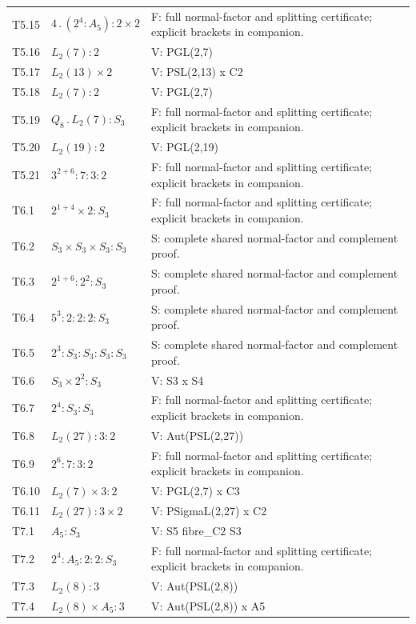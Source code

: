\begin{longtable}{@{}lp{.40\linewidth}>{\raggedright\arraybackslash}p{.46\linewidth}@{}}
T5.15 & $4 \mathbin{.} (2^4 : A_{5}) : 2 \times 2$ & F: full normal-factor and splitting certificate; explicit brackets in companion.\\
T5.16 & $L_{2}(7) : 2$ & V: PGL(2,7)\\
T5.17 & $L_{2}(13) \times 2$ & V: PSL(2,13) x C2\\
T5.18 & $L_{2}(7) : 2$ & V: PGL(2,7)\\
T5.19 & $Q_{8} \mathbin{.} L_{2}(7) : S_{3}$ & F: full normal-factor and splitting certificate; explicit brackets in companion.\\
T5.20 & $L_{2}(19) : 2$ & V: PGL(2,19)\\
T5.21 & $3^{2+6} : 7 : 3 : 2$ & F: full normal-factor and splitting certificate; explicit brackets in companion.\\
T6.1 & $2^{1+4} \times 2 : S_{3}$ & F: full normal-factor and splitting certificate; explicit brackets in companion.\\
T6.2 & $S_{3} \times S_{3} \times S_{3} : S_{3}$ & S: complete shared normal-factor and complement proof.\\
T6.3 & $2^{1+6} : 2^2 : S_{3}$ & S: complete shared normal-factor and complement proof.\\
T6.4 & $5^3 : 2 : 2 : 2 : S_{3}$ & S: complete shared normal-factor and complement proof.\\
T6.5 & $2^3 : S_{3} : S_{3} : S_{3} : S_{3}$ & S: complete shared normal-factor and complement proof.\\
T6.6 & $S_{3} \times 2^2 : S_{3}$ & V: S3 x S4\\
T6.7 & $2^4 : S_{3} : S_{3}$ & F: full normal-factor and splitting certificate; explicit brackets in companion.\\
T6.8 & $L_{2}(27) : 3 : 2$ & V: Aut(PSL(2,27))\\
T6.9 & $2^6 : 7 : 3 : 2$ & F: full normal-factor and splitting certificate; explicit brackets in companion.\\
T6.10 & $L_{2}(7) \times 3 : 2$ & V: PGL(2,7) x C3\\
T6.11 & $L_{2}(27) : 3 \times 2$ & V: PSigmaL(2,27) x C2\\
T7.1 & $A_{5} : S_{3}$ & V: S5 fibre\_C2 S3\\
T7.2 & $2^4 : A_{5} : 2 : 2 : S_{3}$ & F: full normal-factor and splitting certificate; explicit brackets in companion.\\
T7.3 & $L_{2}(8) : 3$ & V: Aut(PSL(2,8))\\
T7.4 & $L_{2}(8) \times A_{5} : 3$ & V: Aut(PSL(2,8)) x A5\\

\end{longtable}
